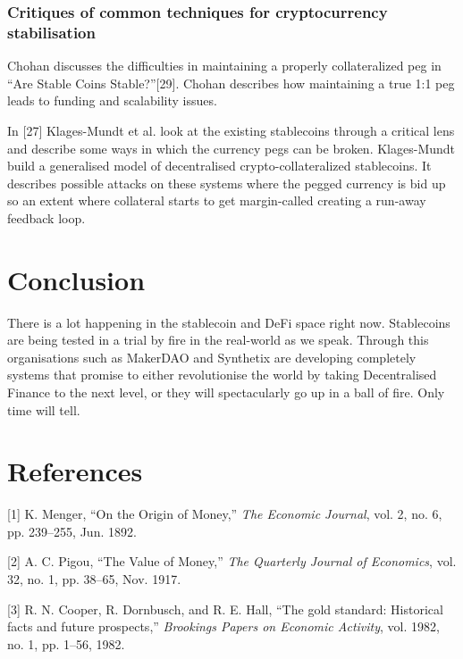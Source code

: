\documentclass[english,]{IEEEtran}
\begin{document}
\subsubsection{Critiques of common techniques for cryptocurrency
stabilisation}\label{critiques-of-common-techniques-for-cryptocurrency-stabilisation}

Chohan discusses the difficulties in maintaining a properly
collateralized peg in ``Are Stable Coins Stable?''{[}29{]}. Chohan
describes how maintaining a true 1:1 peg leads to funding and
scalability issues.

In {[}27{]} Klages-Mundt et al. look at the existing stablecoins through
a critical lens and describe some ways in which the currency pegs can be
broken. Klages-Mundt build a generalised model of decentralised
crypto-collateralized stablecoins. It describes possible attacks on
these systems where the pegged currency is bid up so an extent where
collateral starts to get margin-called creating a run-away feedback
loop.

\section{Conclusion}\label{conclusion}

There is a lot happening in the stablecoin and DeFi space right now.
Stablecoins are being tested in a trial by fire in the real-world as we
speak. Through this organisations such as MakerDAO and Synthetix are
developing completely systems that promise to either revolutionise the
world by taking Decentralised Finance to the next level, or they will
spectacularly go up in a ball of fire. Only time will tell.

\section*{References}\label{references}

\hypertarget{refs}{}
\hypertarget{ref-On_the_Origin_of_Money}{}
{[}1{]} K. Menger, ``On the Origin of Money,'' \emph{The Economic
Journal}, vol. 2, no. 6, pp. 239--255, Jun. 1892.

\hypertarget{ref-Value_of_Money}{}
{[}2{]} A. C. Pigou, ``The Value of Money,'' \emph{The Quarterly Journal
of Economics}, vol. 32, no. 1, pp. 38--65, Nov. 1917.

\hypertarget{ref-The_Gold_Standard}{}
{[}3{]} R. N. Cooper, R. Dornbusch, and R. E. Hall, ``The gold standard:
Historical facts and future prospects,'' \emph{Brookings Papers on
Economic Activity}, vol. 1982, no. 1, pp. 1--56, 1982.
\end{document}
